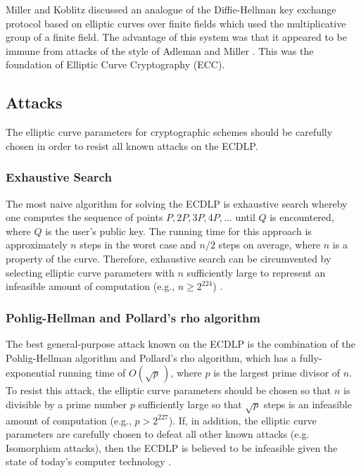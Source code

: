 \documentclass[12pt,a4paper]{article}
\begin{document}
Miller \citeyear{10.1007/3-540-39799-X_31} and Koblitz \citeyear{koblitz1987elliptic} discussed an analogue of the 
Diffie-Hellman key exchange protocol based on elliptic curves over finite fields which used the multiplicative group of a finite field. 
The advantage of this system was that it appeared to be immune from attacks of the style of 
Adleman \citeyear{4568001} and Miller \citeyear{10.1007/3-540-39799-X_31}. 
This was the foundation of Elliptic Curve Cryptography (ECC). 

\subsection{Attacks} \noindent
The elliptic curve parameters for cryptographic schemes should be carefully chosen in order to resist all known attacks on the ECDLP. 

\subsubsection{Exhaustive Search} \noindent \label{Exhaustive Search}
The most naive algorithm for solving the ECDLP is exhaustive search whereby one computes the sequence of points 
$P,2P,3P,4P,...$ until $Q$ is encountered, where $Q$ is the user's public key. 
The running time for this approach is approximately $n$ steps in the worst case and $n/2$ steps on average, 
where $n$ is a property of the curve. 
Therefore, exhaustive search can be circumvented by selecting elliptic curve parameters with $n$ sufficiently 
large to represent an infeasible amount of computation (e.g., $n \geq 2^{224}$) \cite{hankerson2003guide}. 

\subsubsection{Pohlig-Hellman and Pollard's rho algorithm} \noindent \label{Pohlig-Hellman and Pollard's rho algorithm}
The best general-purpose attack known on the ECDLP is the combination of the Pohlig-Hellman algorithm and Pollard's rho algorithm, 
which has a fully-exponential running time of $O( \sqrt p \,)$, where $p$ is the largest prime divisor of $n$. 
To resist this attack, the elliptic curve parameters should be chosen so that $n$ is divisible by a prime number $p$ sufficiently large 
so that $\sqrt p$ steps is an infeasible amount of computation (e.g., $p > 2^{227}$). 
If, in addition, the elliptic curve parameters are carefully chosen to defeat all other known attacks (e.g. Isomorphism attacks), 
then the ECDLP is believed to be infeasible given the state of today's computer technology \cite{hankerson2003guide}. 
\end{document}
